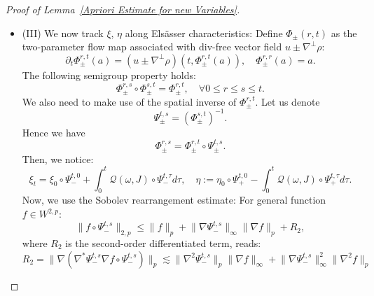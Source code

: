 \documentclass[12pt,letterpaper]{article}
\theoremstyle{plain}
\begin{document}
\begin{proof}[Proof of Lemma~\ref{Apriori Estimate for new Variables}]
\begin{itemize}
   By Sobolev estimates of rearrangements \eqref{Transport Estimate}, we have
   \begin{equation*}
    \lVert\xi   \rVert_{1,p}\lesssim 1+\lVert\nabla X\rVert_\infty \lVert\tilde\xi\rVert_{1,p},\quad \lVert\eta   \rVert_{1,p}\lesssim 1+\lVert\nabla X\rVert_\infty \lVert\tilde\eta\rVert_{1,p},
   \end{equation*}
   which, together with the estimate $\lVert \omega\rVert_{1,p}\lesssim Y$ and \eqref{Magnetic field Estimate II}, demonstrates \eqref{Elsasser variable estimates}.
   \item [](III) We now track $\xi$, $\eta$ along Els\"asser characteristics: Define $\Phi_\pm(r,t)$ as the two-parameter flow map associated with div-free vector field $u{\pm}\nabla^\perp\rho$:
   \begin{equation*}
    \partial_t\Phi_{\pm}^{r,t}(a)=(u\pm \nabla^\perp \rho)(t,\Phi_\pm^{r,t}(a)),\quad \Phi_\pm^{r,r}(a)=a.   \end{equation*}
    The following semigroup property holds:
    \begin{equation*}
       \Phi_{\pm}^{r,s}\circ \Phi_{\pm}^{s,t}=\Phi_{\pm}^{r,t},\quad \forall 0\le r\le s\le t. 
    \end{equation*}
    We also need to make use of the spatial inverse of $\Phi_{\pm}^{r,t}$. Let us denote
    \begin{equation*}
      \Psi_{\pm}^{t,s}=(\Phi_{\pm}^{s,t})^{-1}.  
    \end{equation*}
    Hence we have 
    \begin{equation*}
      \Phi_{\pm}^{r,s} = \Phi_{\pm}^{r,t}\circ \Psi_{\pm}^{t,s}.
    \end{equation*}
Then, we notice:
\begin{equation}\label{Elssaser Variables along Characteristics}
 \xi_t=\xi_0\circ \Psi_-^{t,0}+\int_0^t \mathscr Q(\omega,J)\circ \Psi_-^{t,\tau} d\tau,\quad  \eta:=\eta_0\circ  \Psi_+^{t,0}-\int_0^t \mathscr Q(\omega,J)\circ \Psi_+^{t,\tau}d\tau.  
\end{equation}
Now, we use the Sobolev rearrangement estimate: For general function $f\in W^{2,p}$:
\begin{equation*}
   \lVert f\circ \Psi_-^{t,s}\rVert_{2,p}\le \lVert f\rVert_p+\lVert\nabla \Psi_-^{t,s}\rVert_\infty\lVert\nabla f\rVert_p+R_2,
\end{equation*}
where $R_2$ is the second-order differentiated term, reads:
\begin{equation*}
 R_2=\lVert\nabla(\nabla^*\Psi_-^{t,s}\nabla f\circ \Psi_-^{t,s})\rVert_p\lesssim \lVert \nabla^2\Psi_-^{t,s}\rVert_p \lVert\nabla f\rVert_\infty+\lVert\nabla\Psi_-^{t,s}\rVert_\infty^2\lVert\nabla^2f\rVert_p    

\end{equation*}
\end{itemize}
\end{proof}
\end{document}
